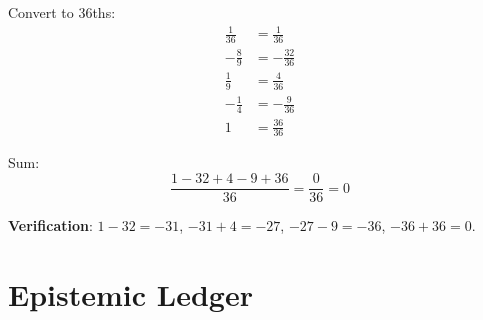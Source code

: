 \documentclass[11pt,a4paper]{article}
\begin{document}
Convert to 36ths:
\begin{align}
\label{eq:u1-3-36ths}
\frac{1}{36} &= \frac{1}{36} \\
-\frac{8}{9} &= -\frac{32}{36} \\
\frac{1}{9} &= \frac{4}{36} \\
-\frac{1}{4} &= -\frac{9}{36} \\
1 &= \frac{36}{36}
\end{align}

Sum:
\begin{equation}
\label{eq:u1-3-final}
\frac{1 - 32 + 4 - 9 + 36}{36} = \frac{0}{36} = 0
\end{equation}

\textbf{Verification}: $1 - 32 = -31$, $-31 + 4 = -27$, $-27 - 9 = -36$, $-36 + 36 = 0$. \checkmark

\section{Epistemic Ledger}
\label{app:ledger}
\end{document}
